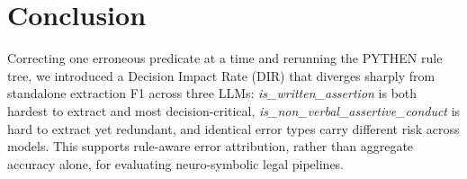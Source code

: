 \section{Conclusion}
\label{sec:conclusion}

Correcting one erroneous predicate at a time and rerunning the PYTHEN rule tree, we introduced a Decision Impact Rate (DIR) that diverges sharply from standalone extraction F1 across three LLMs: \textit{is\_written\_assertion} is both hardest to extract and most decision-critical, \textit{is\_non\_verbal\_assertive\_conduct} is hard to extract yet redundant, and identical error types carry different risk across models. This supports rule-aware error attribution, rather than aggregate accuracy alone, for evaluating neuro-symbolic legal pipelines.
